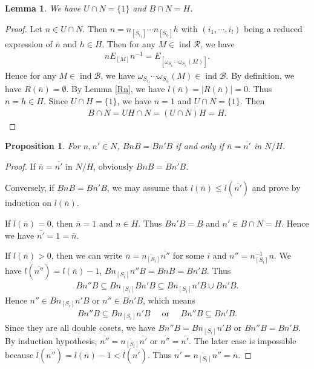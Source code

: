 \documentclass[12pt]{amsart}
\newtheorem{lemma}[theorem]{Lemma}
\newtheorem{proposition}[theorem]{Proposition}
\begin{document}
\begin{lemma}
    We have 
    $U\cap N = \{1\}$ and $B\cap N = H$.
\end{lemma}

\begin{proof}
    Let $n\in U\cap N$. Then $n=n_{[S_{i_1}]}\cdots n_{[S_{i_l}]}h$ with $(i_1,\cdots,i_l)$ being a reduced expression of $\overline{n}$ and $h\in H$.
    Then for any $ M \in \operatorname{ind}\mathcal{R}$, we have
    \begin{align*}
        nE_{[M]}n^{-1} = E_{[\omega_{S_{i_1}}\cdots \omega_{S_{i_l} } (M) ]}.
    \end{align*}
    Hence for any $M \in \operatorname{ind}\mathcal{B}$, we have $\omega_{S_{i_1}}\cdots \omega_{S_{i_l} } (M)\in \operatorname{ind}\mathcal{B}$.
    By definition, we have $R(\overline{n}) =  \emptyset $.
    By Lemma \ref{Rn}, we have $l(\overline{n}) = |R(\overline{n}) |= 0$.
    Thus $n=h\in H$. 
    Since $U\cap H = \{1\}$, we have $n=1$ and $U\cap N=\{ 1\}$. Then
    \begin{align*}
        B\cap N = UH\cap N = (U\cap N)H=H.
    \end{align*}
\end{proof}

\begin{proposition}
    For $n,n'\in N$, $BnB=Bn'B$ if and only if $\overline{n}=\overline{n'} $ in $N/H$.
\end{proposition}

\begin{proof}
    If $\overline{n}=\overline{n'} $ in $N/H$, obviously $BnB=Bn'B$.
    
    Conversely, if $BnB=Bn'B$, we may assume that $l(\overline{n})\leq l(\overline{n'})$ and prove by induction on $l(\overline{n})$.

    If $l(\overline{n})=0$, then $\overline{n} = 1$ and $n\in H$. 
    Thus $Bn'B=B$ and $n'\in B\cap N = H$. 
    Hence we have $\overline{n'} = 1 = \overline{n}$.

    If $l(\overline{n})>0$, then we can write $\overline{n}=\overline{n_{[S_i]}}\overline{n''}$ for some $i$ and $n''=n_{[S_i]}^{-1}n$. 
    We have $l(\overline{n''}) = l(\overline{n}) - 1$, $Bn_{[S_i]}n''B = BnB = Bn'B$.
    Thus
    \begin{align*}
        Bn''B\subseteq  Bn_{[S_i]}Bn'B \subseteq  Bn_{[S_i]}n'B \cup Bn'B.
    \end{align*}
    Hence $n''\in Bn_{[S_i]}n'B$ or $n''\in Bn'B$, which means 
    \begin{align*}
        Bn''B\subseteq  Bn_{[S_i]}n'B \quad \text{  or  } \quad Bn''B\subseteq  Bn'B.
    \end{align*}
    Since they are all double cosets, we have $ Bn''B= Bn_{[S_i]}n'B$ or $Bn''B= Bn'B$.
    By induction hypothesis, $\overline{n''}=\overline{n_{[S_i]}}\overline{n'}$ or $\overline{n''}=\overline{n'}$.
    The later case is impossible because $l(\overline{n''})=l(\overline{n})-1 < l(\overline{n'})$.
    Thus $\overline{n'} = \overline{n_{[S_i]}}\overline{n''} = \overline{n}$.
\end{proof}
\end{document}
